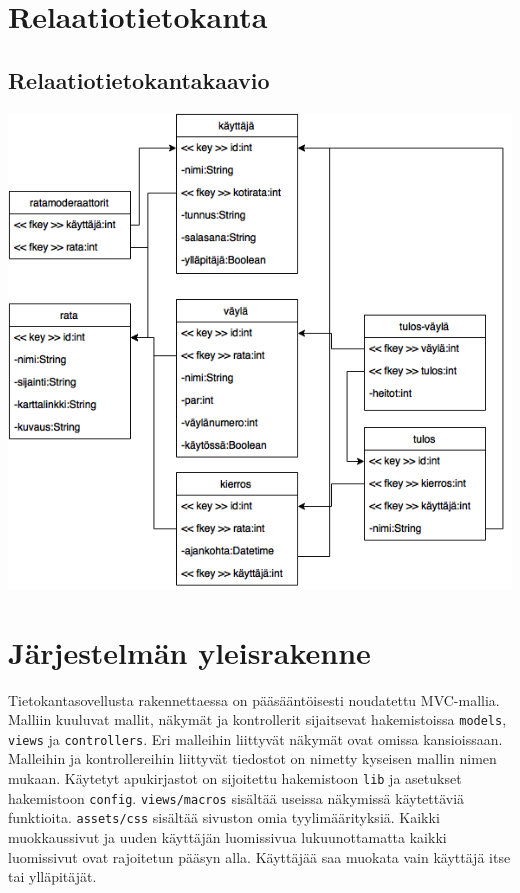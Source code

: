 \documentclass[10pt,a4paper]{article}
\begin{document}
\section{Relaatiotietokanta}
\subsection{Relaatiotietokantakaavio}
\includegraphics[scale=0.6]{tsoha_relaatiotietokantakaavio}
\newpage
\section{Järjestelmän yleisrakenne}
Tietokantasovellusta rakennettaessa on pääsääntöisesti noudatettu MVC-mallia. Malliin kuuluvat mallit, näkymät ja kontrollerit sijaitsevat hakemistoissa \texttt{models}, \texttt{views} ja \texttt{controllers}. Eri malleihin liittyvät näkymät ovat omissa kansioissaan. Malleihin ja kontrollereihin liittyvät tiedostot on nimetty kyseisen mallin nimen mukaan.
Käytetyt apukirjastot on sijoitettu hakemistoon \texttt{lib} ja asetukset hakemistoon \texttt{config}.
\texttt{views/macros} sisältää useissa näkymissä käytettäviä funktioita.
\texttt{assets/css} sisältää sivuston omia tyylimäärityksiä.
Kaikki muokkaussivut ja uuden käyttäjän luomissivua lukuunottamatta kaikki luomissivut ovat rajoitetun pääsyn alla. Käyttäjää saa muokata vain käyttäjä itse tai ylläpitäjät.
\newpage
\end{document}
